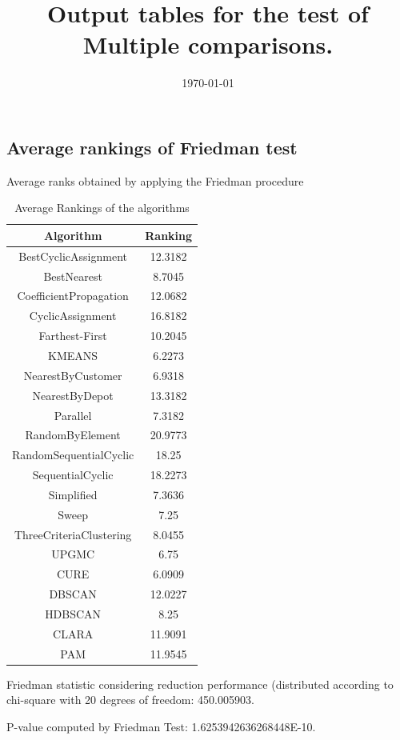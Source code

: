 \documentclass[a4paper,10pt]{article}
\title{Output tables for the test of Multiple comparisons.}
\author{}
\date{\today}
\begin{document}
\begin{landscape}
\pagestyle{empty}
\maketitle
\thispagestyle{empty}
\section{Average rankings of Friedman test}



Average ranks obtained by applying the Friedman procedure

\begin{table}[!htp]
\centering
\begin{tabular}{|c|c|}\hline
Algorithm&Ranking\\\hline
BestCyclicAssignment & 12.3182\\
BestNearest & 8.7045\\
CoefficientPropagation & 12.0682\\
CyclicAssignment & 16.8182\\
Farthest-First & 10.2045\\
KMEANS & 6.2273\\
NearestByCustomer & 6.9318\\
NearestByDepot & 13.3182\\
Parallel & 7.3182\\
RandomByElement & 20.9773\\
RandomSequentialCyclic & 18.25\\
SequentialCyclic & 18.2273\\
Simplified & 7.3636\\
Sweep & 7.25\\
ThreeCriteriaClustering & 8.0455\\
UPGMC & 6.75\\
CURE & 6.0909\\
DBSCAN & 12.0227\\
HDBSCAN & 8.25\\
CLARA & 11.9091\\
PAM & 11.9545\\
\hline
\end{tabular}
\caption{Average Rankings of the algorithms}
\end{table}

Friedman statistic considering reduction performance (distributed according to chi-square with 20 degrees of freedom: 450.005903.

P-value computed by Friedman Test: 1.6253942636268448E-10.\newline


\end{landscape}
\end{document}
